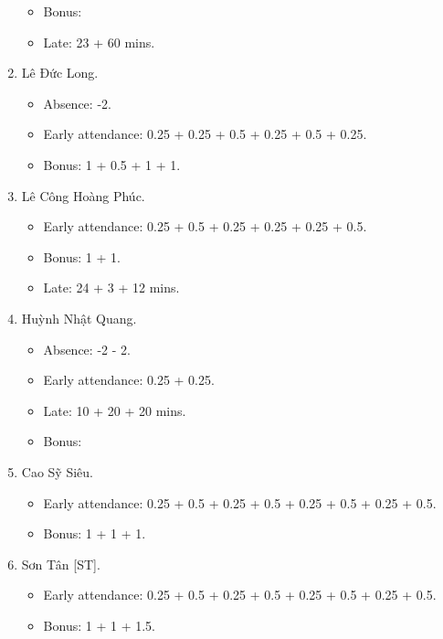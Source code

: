 \documentclass{article}
\begin{document}
\begin{enumerate}
\begin{itemize}
		\item Bonus: 
		\item Late: 23 + 60 mins.
	\end{itemize}
	\item {\sc Lê Đức Long.}
	\begin{itemize}
		\item Absence: -2.
		\item Early attendance: 0.25 + 0.25 + 0.5 + 0.25 + 0.5 + 0.25.
		\item Bonus: 1 + 0.5 + 1 + 1.
	\end{itemize}
	\item {\sc Lê Công Hoàng Phúc.}
	\begin{itemize}
		\item Early attendance: 0.25 + 0.5 + 0.25 + 0.25 + 0.25 + 0.5.
		\item Bonus: 1 + 1. 
		\item Late: 24 + 3 + 12 mins.
	\end{itemize}
	\item {\sc Huỳnh Nhật Quang.}
	\begin{itemize}
		\item Absence: -2 - 2.
		\item Early attendance: 0.25 + 0.25.
		\item Late: 10 + 20 + 20 mins.
		\item Bonus: 
	\end{itemize}
	\item {\sc Cao Sỹ Siêu.}
	\begin{itemize}
		\item Early attendance: 0.25 + 0.5 + 0.25 + 0.5 + 0.25 + 0.5 + 0.25 + 0.5.
		\item Bonus: 1 + 1 + 1.
	\end{itemize}
	\item {\sc Sơn Tân [ST].}
	\begin{itemize}
		\item Early attendance: 0.25 + 0.5 + 0.25 + 0.5 + 0.25 + 0.5 + 0.25 + 0.5.
		\item Bonus: 1 + 1 + 1.5.
		

\end{itemize}
\end{enumerate}
\end{document}
